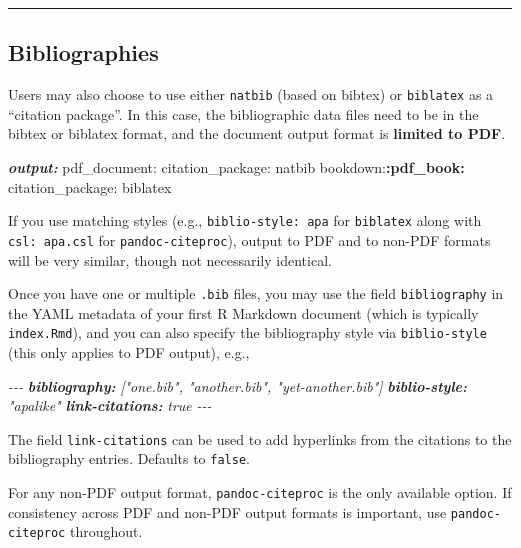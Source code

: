\documentclass[
  a4paper,
  twoside,
  openright]{book}
\newenvironment{Shaded}{\begin{snugshade}}{\end{snugshade}}
\newcommand{\AnnotationTok}[1]{\textcolor[rgb]{0.56,0.35,0.01}{\textbf{\textit{#1}}}}
\newcommand{\CommentTok}[1]{\textcolor[rgb]{0.56,0.35,0.01}{\textit{#1}}}
\newcommand{\NormalTok}[1]{#1}
\newcommand{\SpecialCharTok}[1]{\textcolor[rgb]{0.81,0.36,0.00}{\textbf{#1}}}
\theoremstyle{definition}
\theoremstyle{definition}
\theoremstyle{definition}
\theoremstyle{definition}
\theoremstyle{remark}
\begin{document}
\begin{center}\rule{0.5\linewidth}{0.5pt}\end{center}

\subsection{Bibliographies}\label{bibliographies}

Users may also choose to use either \texttt{natbib} (based on bibtex) or \texttt{biblatex} as a ``citation package''.
In this case, the bibliographic data files need to be in the bibtex or biblatex format, and the document output format is \textbf{limited to PDF}.

\begin{Shaded}
\begin{Highlighting}[]
\AnnotationTok{output:}
\NormalTok{  pdf\_document:}
\NormalTok{    citation\_package: natbib}
\NormalTok{  bookdown:}\SpecialCharTok{:pdf\_book:}
\NormalTok{    citation\_package: biblatex}
\end{Highlighting}
\end{Shaded}

If you use matching styles (e.g., \texttt{biblio-style:\ apa} for \texttt{biblatex} along with \texttt{csl:\ apa.csl} for \texttt{pandoc-citeproc}), output to PDF and to non-PDF formats will be very similar, though not necessarily identical.

Once you have one or multiple \texttt{.bib} files, you may use the field \texttt{bibliography} in the YAML metadata of your first R Markdown document (which is typically \texttt{index.Rmd}), and you can also specify the bibliography style via \texttt{biblio-style} (this only applies to PDF output), e.g.,

\begin{Shaded}
\begin{Highlighting}[]
\CommentTok{{-}{-}{-}}
\AnnotationTok{bibliography:}\CommentTok{ ["one.bib", "another.bib", "yet{-}another.bib"]}
\AnnotationTok{biblio{-}style:}\CommentTok{ "apalike"}
\AnnotationTok{link{-}citations:}\CommentTok{ true}
\CommentTok{{-}{-}{-}}
\end{Highlighting}
\end{Shaded}

The field \texttt{link-citations} can be used to add hyperlinks from the citations to the bibliography entries. Defaults to \texttt{false}.

For any non-PDF output format, \texttt{pandoc-citeproc} is the only available option. If consistency across PDF and non-PDF output formats is important, use \texttt{pandoc-citeproc} throughout.
\end{document}
